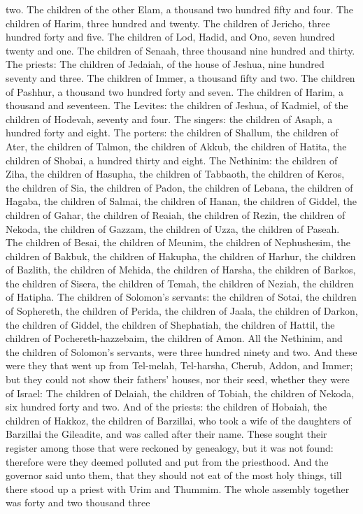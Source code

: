 two. The children of the other Elam, a thousand two hundred fifty and four. The children of Harim, three hundred and twenty. The children of Jericho, three hundred forty and five. The children of Lod, Hadid, and Ono, seven hundred twenty and one. The children of Senaah, three thousand nine hundred and thirty.  The priests: The children of Jedaiah, of the house of Jeshua, nine hundred seventy and three. The children of Immer, a thousand fifty and two. The children of Pashhur, a thousand two hundred forty and seven. The children of Harim, a thousand and seventeen.  The Levites: the children of Jeshua, of Kadmiel, of the children of Hodevah, seventy and four. The singers: the children of Asaph, a hundred forty and eight. The porters: the children of Shallum, the children of Ater, the children of Talmon, the children of Akkub, the children of Hatita, the children of Shobai, a hundred thirty and eight.  The Nethinim: the children of Ziha, the children of Hasupha, the children of Tabbaoth, the children of Keros, the children of Sia, the children of Padon, the children of Lebana, the children of Hagaba, the children of Salmai, the children of Hanan, the children of Giddel, the children of Gahar, the children of Reaiah, the children of Rezin, the children of Nekoda, the children of Gazzam, the children of Uzza, the children of Paseah. The children of Besai, the children of Meunim, the children of Nephushesim, the children of Bakbuk, the children of Hakupha, the children of Harhur, the children of Bazlith, the children of Mehida, the children of Harsha, the children of Barkos, the children of Sisera, the children of Temah, the children of Neziah, the children of Hatipha.  The children of Solomon’s servants: the children of Sotai, the children of Sophereth, the children of Perida, the children of Jaala, the children of Darkon, the children of Giddel, the children of Shephatiah, the children of Hattil, the children of Pochereth-hazzebaim, the children of Amon. All the Nethinim, and the children of Solomon’s servants, were three hundred ninety and two.  And these were they that went up from Tel-melah, Tel-harsha, Cherub, Addon, and Immer; but they could not show their fathers’ houses, nor their seed, whether they were of Israel: The children of Delaiah, the children of Tobiah, the children of Nekoda, six hundred forty and two. And of the priests: the children of Hobaiah, the children of Hakkoz, the children of Barzillai, who took a wife of the daughters of Barzillai the Gileadite, and was called after their name. These sought their register among those that were reckoned by genealogy, but it was not found: therefore were they deemed polluted and put from the priesthood. And the governor said unto them, that they should not eat of the most holy things, till there stood up a priest with Urim and Thummim.  The whole assembly together was forty and two thousand three 